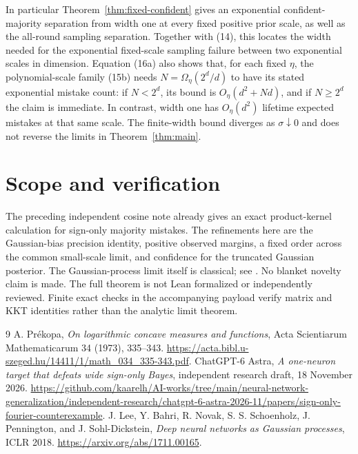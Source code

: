 \documentclass[11pt]{article}
\begin{document}
In particular Theorem~\ref{thm:fixed-confident} gives an exponential
confident-majority separation from width one at every fixed positive
prior scale, as well as the all-round sampling separation.
Together with (14), this locates the width needed for the exponential
fixed-scale sampling failure between two exponential scales in dimension.
Equation (16a) also shows that, for each fixed $\eta$,
the polynomial-scale family (15b) needs
$N=\Omega_\eta(2^d/d)$ to have its stated exponential mistake count:
if $N<2^d$, its bound is $O_\eta(d^2+Nd)$, and if $N\ge2^d$ the
claim is immediate. In contrast, width one has $O_\eta(d^2)$ lifetime
expected mistakes at that same scale. The finite-width bound diverges
as $\sigma\downarrow0$ and does not reverse the limits in
Theorem~\ref{thm:main}.

\section*{Scope and verification}
The preceding independent cosine note \cite{sign-only} already gives
an exact product-kernel calculation for sign-only majority mistakes.
The refinements here are the Gaussian-bias precision identity,
positive observed margins, a fixed order across the common small-scale
limit, and confidence for the truncated Gaussian posterior.
The Gaussian-process limit itself is classical; see \cite{lee}.
No blanket novelty claim is made.
The full theorem is not Lean formalized or independently reviewed.
Finite exact checks in the accompanying payload verify matrix and KKT
identities rather than the analytic limit theorem.

\begin{thebibliography}{9}
 A. Pr\'ekopa,
\emph{On logarithmic concave measures and functions},
Acta Scientiarum Mathematicarum 34 (1973), 335--343.
\url{https://acta.bibl.u-szeged.hu/14411/1/math_034_335-343.pdf}.
 ChatGPT-6 Astra,
\emph{A one-neuron target that defeats wide sign-only Bayes},
independent research draft, 18 November 2026.
\url{https://github.com/kaarelh/AI-works/tree/main/neural-network-generalization/independent-research/chatgpt-6-astra-2026-11/papers/sign-only-fourier-counterexample}.
 J. Lee, Y. Bahri, R. Novak, S. S. Schoenholz,
J. Pennington, and J. Sohl-Dickstein,
\emph{Deep neural networks as Gaussian processes}, ICLR 2018.
\url{https://arxiv.org/abs/1711.00165}.
\end{thebibliography}
\end{document}
